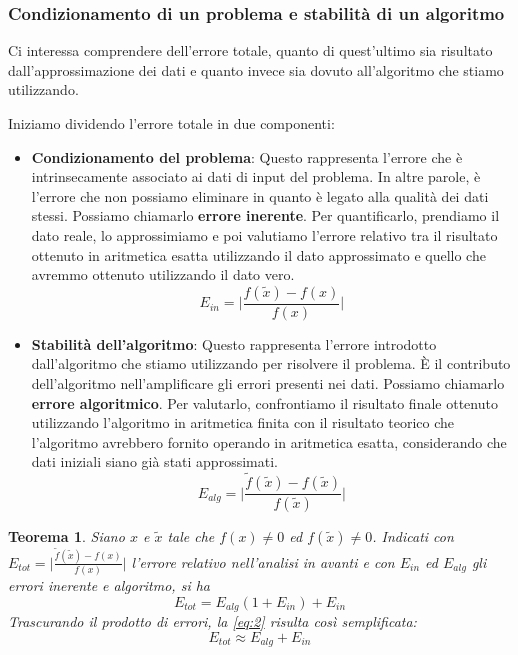 \documentclass{article}
\newtheorem*{theorem}{\color{green}\textbf{Teorema}}
\numberwithin{equation}{section}
\begin{document}
\subsubsection{Condizionamento di un problema e stabilità di un algoritmo}

Ci interessa comprendere dell'errore totale, quanto di
quest'ultimo sia risultato dall'approssimazione dei dati e quanto invece sia
dovuto all'algoritmo che stiamo utilizzando.

Iniziamo dividendo l'errore totale in due componenti:
\begin{itemize}
    \item \textbf{Condizionamento del problema}: Questo rappresenta l'errore
        che è intrinsecamente associato ai dati di input del problema. In altre
        parole, è l'errore che non possiamo eliminare in quanto è legato alla
        qualità dei dati stessi. Possiamo chiamarlo \textbf{errore inerente}.
        Per quantificarlo, prendiamo il dato reale, lo approssimiamo e poi
        valutiamo l'errore relativo tra il risultato ottenuto in aritmetica esatta  
        utilizzando il  dato approssimato e quello che avremmo ottenuto utilizzando il dato
        vero.
        $$E_{in}=\Big\lvert \frac{f(\tilde{x})-f(x)}{f(x)}\Big\rvert$$
    \item \textbf{Stabilità dell'algoritmo}: Questo rappresenta l'errore
        introdotto dall'algoritmo che stiamo utilizzando per risolvere il
        problema. È il contributo dell'algoritmo nell'amplificare gli errori
        presenti nei dati. Possiamo chiamarlo \textbf{errore algoritmico}. Per
        valutarlo, confrontiamo il risultato finale ottenuto utilizzando
        l'algoritmo in aritmetica finita con il risultato teorico che
        l'algoritmo avrebbero fornito operando in aritmetica esatta,
        considerando che dati iniziali siano già stati approssimati.
        $$E_{alg}=\Big\lvert
        \frac{\tilde{f}(\tilde{x})-f(\tilde{x})}{f(\tilde{x})} \Big\rvert$$
\end{itemize}
\begin{theorem}
    Siano $x$ e $\tilde{x}$ tale che $f(x)\neq0$ ed $f(\tilde{x})\neq0$.
    Indicati con $E_{tot}=\Big\lvert
    \frac{\tilde{f}(\tilde{x})-f(x)}{f(x)}\Big\rvert$ l'errore relativo 
    nell'analisi in avanti e con
    $E_{in}$ ed $E_{alg}$ gli errori inerente e algoritmo, si ha 
    \begin{equation} \label{eq:2}
        E_{tot}=E_{alg}(1+E_{in})+E_{in}
    \end{equation}
    Trascurando il prodotto di errori, la \ref{eq:2} risulta così semplificata:
    {\color{green}$$E_{tot}\approx E_{alg}+E_{in}$$}
\end{theorem}
\end{document}
